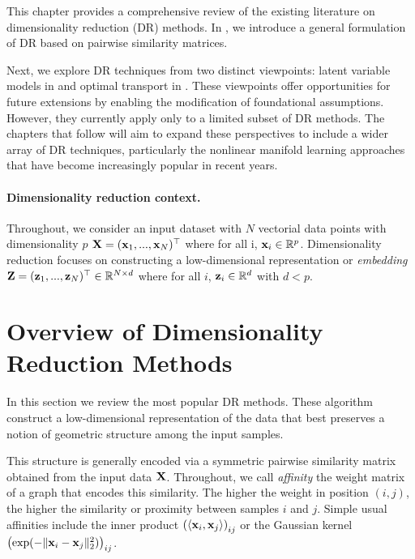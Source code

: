 \newpage

This chapter provides a comprehensive review of the existing literature on dimensionality reduction (DR) methods. In , we introduce a general formulation of DR based on pairwise similarity matrices.

Next, we explore DR techniques from two distinct viewpoints: latent variable models in  and optimal transport in . These viewpoints offer opportunities for future extensions by enabling the modification of foundational assumptions. However, they currently apply only to a limited subset of DR methods. The chapters that follow will aim to expand these perspectives to include a wider array of DR techniques, particularly the nonlinear manifold learning approaches that have become increasingly popular in recent years.


\paragraph{Dimensionality reduction context.}
Throughout, we consider an input dataset with $N$ vectorial data points with dimensionality $p$ \ie ${\mathbf{X}} = ({\mathbf{x}}_1, ..., {\mathbf{x}}_N) ^\top$ where for all i, ${\mathbf{x}}_i \in \mathbb{R}^{p}$. Dimensionality reduction focuses on constructing a low-dimensional representation or \emph{embedding} ${\mathbf{Z}} = ({\mathbf{z}}_1, ..., {\mathbf{z}}_N)^\top \in \mathbb{R}^{N \times d}$ where for all $i$, ${\mathbf{z}}_i \in \mathbb{R}^{d}$ with $d < p$.

\section{Overview of Dimensionality Reduction Methods}\label{sec:background_dr}

In this section we review the most popular DR methods. These algorithm construct a low-dimensional representation of the data that best preserves a notion of geometric structure among the input samples. 

This structure is generally encoded via a symmetric pairwise similarity matrix obtained from the input data ${\mathbf{X}}$. Throughout, we call \emph{affinity} the weight matrix of a graph that encodes this similarity. The higher the weight in position $(i,j)$, the
higher the similarity or proximity between samples $i$ and $j$. Simple usual affinities include the inner product $\left( \langle {\mathbf{x}}_i, {\mathbf{x}}_j \rangle \right)_{ij}$ or the Gaussian kernel $\left( \exp(-\|{\mathbf{x}}_i - {\mathbf{x}}_j\|_2^2) \right)_{ij}$.


